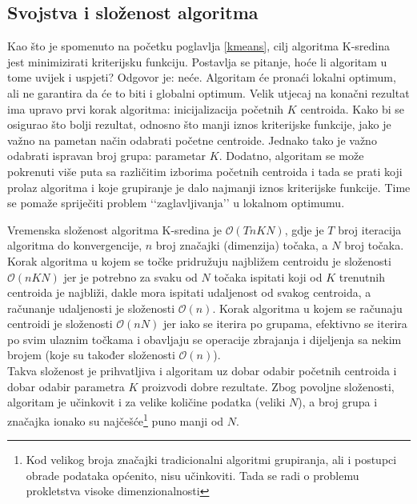 \documentclass[times, utf8, zavrsni]{fer}
\begin{document}
\subsection{Svojstva i složenost algoritma}
\label{kmsvojstva}
Kao što je spomenuto na početku poglavlja \ref{kmeans}, cilj algoritma K-sredina jest minimizirati kriterijsku funkciju. Postavlja se pitanje, hoće li algoritam u tome uvijek i uspjeti? Odgovor je: neće. Algoritam će pronaći lokalni optimum, ali ne garantira da će to biti i globalni optimum. Velik utjecaj na konačni rezultat ima upravo prvi korak algoritma: inicijalizacija početnih $K$ centroida. Kako bi se osigurao što bolji rezultat, odnosno što manji iznos kriterijske funkcije, jako je važno na pametan način odabrati početne centroide. Jednako tako je važno odabrati ispravan broj grupa: parametar $K$. Dodatno, algoritam se može pokrenuti više puta sa različitim izborima početnih centroida i tada se prati koji prolaz algoritma i koje grupiranje je dalo najmanji iznos kriterijske funkcije. Time se pomaže spriječiti problem ‘‘zaglavljivanja’’ u lokalnom optimumu.

Vremenska složenost algoritma K-sredina je $\mathcal{O} \left(TnKN\right)$, gdje je $T$ broj iteracija algoritma do konvergencije, $n$ broj značajki (dimenzija) točaka, a $N$ broj točaka. Korak algoritma u kojem se točke pridružuju najbližem centroidu je složenosti $\mathcal{O} \left(nKN\right)$ jer je potrebno za svaku od $N$ točaka ispitati koji od $K$ trenutnih centroida je najbliži, dakle mora ispitati udaljenost od svakog centroida, a računanje udaljenosti je složenosti $\mathcal{O} \left(n\right)$. Korak algoritma u kojem se računaju centroidi je složenosti $\mathcal{O} \left(nN\right)$ jer iako se iterira po grupama, efektivno se iterira po svim ulaznim točkama i obavljaju se operacije zbrajanja i dijeljenja sa nekim brojem (koje su također složenosti $\mathcal{O} \left(n\right)$).\\
Takva složenost je prihvatljiva i algoritam uz dobar odabir početnih centroida i dobar odabir parametra $K$ proizvodi dobre rezultate. Zbog povoljne složenosti, algoritam je učinkovit i za velike količine podatka (veliki $N$), a broj grupa i značajka ionako su najčešće\footnote{Kod velikog broja značajki tradicionalni algoritmi grupiranja, ali i postupci obrade podataka općenito, nisu učinkoviti. Tada se radi o problemu prokletstva visoke dimenzionalnosti } puno manji od $N$.
\end{document}
